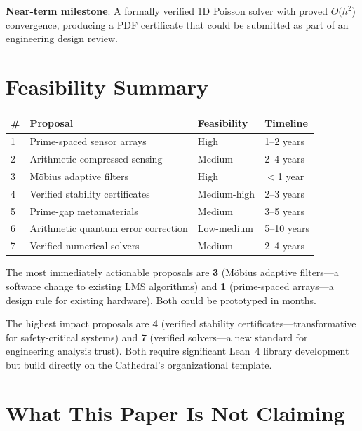\documentclass[11pt,a4paper]{article}
\begin{document}
\textbf{Near-term milestone}: A formally verified 1D Poisson solver
with proved $O(h^2$) convergence, producing a PDF certificate that
could be submitted as part of an engineering design review.

\section{Feasibility Summary}
\label{sec:summary}

\begin{center}
\begin{tabular}{@{}llll@{}}
\toprule
\textbf{\#} & \textbf{Proposal} & \textbf{Feasibility} & \textbf{Timeline} \\
\midrule
1 & Prime-spaced sensor arrays & High & 1--2 years \\
2 & Arithmetic compressed sensing & Medium & 2--4 years \\
3 & M\"obius adaptive filters & High & $<$1 year \\
4 & Verified stability certificates & Medium-high & 2--3 years \\
5 & Prime-gap metamaterials & Medium & 3--5 years \\
6 & Arithmetic quantum error correction & Low-medium & 5--10 years \\
7 & Verified numerical solvers & Medium & 2--4 years \\
\bottomrule
\end{tabular}
\end{center}

The most immediately actionable proposals are \textbf{3} (M\"obius
adaptive filters---a software change to existing LMS algorithms)
and \textbf{1} (prime-spaced arrays---a design rule for existing
hardware). Both could be prototyped in months.

The highest impact proposals are \textbf{4} (verified stability
certificates---transformative for safety-critical systems) and
\textbf{7} (verified solvers---a new standard for engineering
analysis trust). Both require significant Lean~4 library
development but build directly on the Cathedral's organizational
template.

\section{What This Paper Is Not Claiming}
\label{sec:disclaimer}
\end{document}
